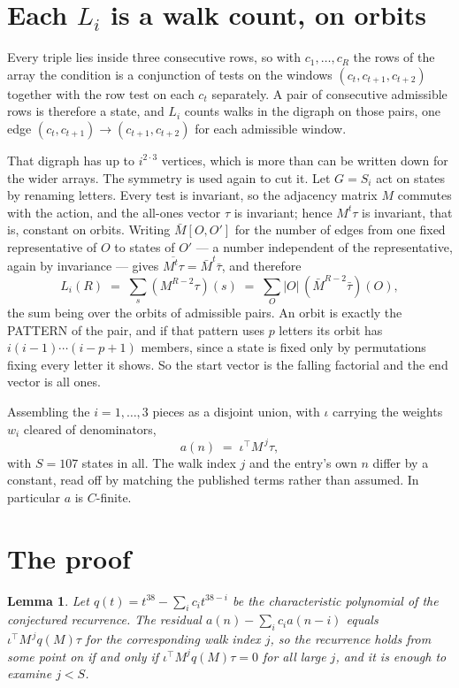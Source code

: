 \documentclass[11pt,a4paper]{article}
\theoremstyle{plain}
\newtheorem{lemma}[theorem]{Lemma}
\theoremstyle{definition}
\begin{document}
\section{Each $L_i$ is a walk count, on orbits}

Every triple lies inside three consecutive rows, so with $c_1,\dots,c_R$ the rows of the array
the condition is a conjunction of tests on the windows $(c_{t},c_{t+1},c_{t+2})$ together
with the row test on each $c_t$ separately. A pair of consecutive admissible rows is therefore
a state, and $L_i$ counts walks in the digraph on those pairs, one edge $(c_t,c_{t+1})\to
(c_{t+1},c_{t+2})$ for each admissible window.

That digraph has up to $i^{2\cdot3}$ vertices, which is more than can be written down for
the wider arrays. The symmetry is used again to cut it. Let $G=S_i$ act on states by renaming
letters. Every test is invariant, so the adjacency matrix $M$ commutes with the action, and the
all-ones vector $\tau$ is invariant; hence $M^{t}\tau$ is invariant, that is, constant on
orbits. Writing $\bar M[O,O']$ for the number of edges from one fixed representative of $O$ to
states of $O'$ --- a number independent of the representative, again by invariance --- gives
$\overline{M^{t}\tau}=\bar M^{t}\bar\tau$, and therefore
\[
L_i(R)\;=\;\sum_{s}(M^{R-2}\tau)(s)\;=\;\sum_{O}|O|\,(\bar M^{R-2}\bar\tau)(O),
\]
the sum being over the orbits of admissible pairs. An orbit is exactly the PATTERN of the pair,
and if that pattern uses $p$ letters its orbit has $i(i-1)\cdots(i-p+1)$ members, since a state
is fixed only by permutations fixing every letter it shows. So the start vector is the falling
factorial and the end vector is all ones.

Assembling the $i=1,\dots,3$ pieces as a disjoint union, with $\iota$ carrying the weights
$w_i$ cleared of denominators,
\[
a(n)\;=\;\iota^{\!\top}M^{\,j}\tau ,
\]
with $S=107$ states in all. The walk index $j$ and the entry's own $n$ differ by a constant,
read off by matching the published terms rather than assumed. In particular $a$ is $C$-finite.

\section{The proof}

\begin{lemma}\label{lem:crit}
Let $q(t)=t^{38}-\sum_i c_it^{38-i}$ be the characteristic polynomial of the
conjectured recurrence. The residual $a(n)-\sum_ic_ia(n-i)$ equals
$\iota^{\!\top}M^{\,j}q(M)\tau$ for the corresponding walk index $j$, so the recurrence
holds from some point on if and only if $\iota^{\!\top}M^{j}q(M)\tau=0$ for all large $j$,
and it is enough to examine $j<S$.
\end{lemma}
\end{document}
